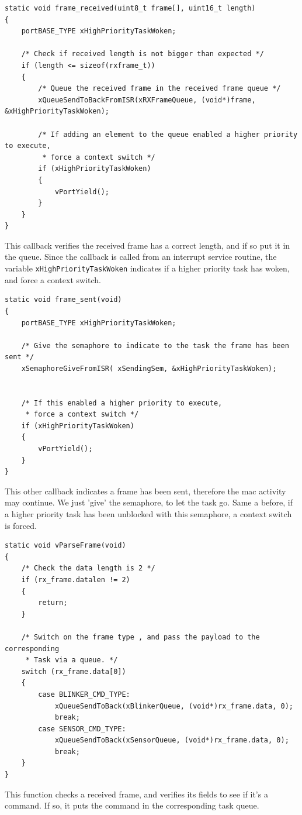 \documentclass[11pt]{report}
\begin{document}
\begin{verbatim}
static void frame_received(uint8_t frame[], uint16_t length)
{
    portBASE_TYPE xHighPriorityTaskWoken;
    
    /* Check if received length is not bigger than expected */
    if (length <= sizeof(rxframe_t))
    {
        /* Queue the received frame in the received frame queue */
        xQueueSendToBackFromISR(xRXFrameQueue, (void*)frame, &xHighPriorityTaskWoken);
        
        /* If adding an element to the queue enabled a higher priority to execute,
         * force a context switch */
        if (xHighPriorityTaskWoken)
        {
            vPortYield();
        }
    }
}
\end{verbatim}
This callback verifies the received frame has a correct length, and if so put it in the queue. Since the callback is called from an interrupt service routine, the variable \verb$xHighPriorityTaskWoken$ indicates if a higher priority task has woken, and force a context switch.

\begin{verbatim}
static void frame_sent(void)
{
    portBASE_TYPE xHighPriorityTaskWoken;
    
    /* Give the semaphore to indicate to the task the frame has been sent */
    xSemaphoreGiveFromISR( xSendingSem, &xHighPriorityTaskWoken);
    
    
    /* If this enabled a higher priority to execute,
     * force a context switch */
    if (xHighPriorityTaskWoken)
    {
        vPortYield();
    }
}
\end{verbatim}
This other callback indicates a frame has been sent, therefore the mac activity may continue. We just 'give' the semaphore, to let the task go. Same a before, if a higher priority task has been unblocked with this semaphore, a context switch is forced.

\begin{verbatim}
static void vParseFrame(void)
{
    /* Check the data length is 2 */
    if (rx_frame.datalen != 2)
    {
        return;
    }
    
    /* Switch on the frame type , and pass the payload to the corresponding
     * Task via a queue. */
    switch (rx_frame.data[0])
    {
        case BLINKER_CMD_TYPE:
            xQueueSendToBack(xBlinkerQueue, (void*)rx_frame.data, 0);
            break;
        case SENSOR_CMD_TYPE:
            xQueueSendToBack(xSensorQueue, (void*)rx_frame.data, 0);
            break;
    }
}
\end{verbatim}
This function checks a received frame, and verifies its fields to see if it's a command. If so, it puts the command in the corresponding task queue.
\end{document}
